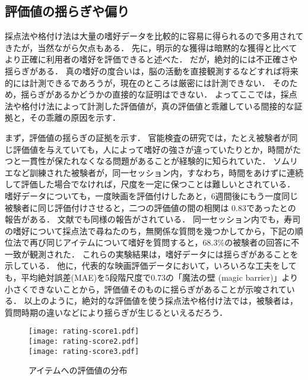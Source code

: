 \subsection{評価値の揺らぎや偏り}

採点法や格付け法は大量の嗜好データを比較的に容易に得られるので多用されてきたが，当然ながら欠点もある．
先に，明示的な獲得は暗黙的な獲得と比べてより正確に利用者の嗜好を評価できると述べた．
だが，絶対的には不正確さや揺らぎがある．
真の嗜好の度合いは，脳の活動を直接観測するなどすれば将来的には計測できるであろうが，現在のところは厳密には計測できない．
そのため，揺らぎがあるかどうかの直接的な証明はできない．
よってここでは，採点法や格付け法によって計測した評価値が，真の評価値と乖離している間接的な証拠と，その乖離の原因を示す．

まず，評価値の揺らぎの証拠を示す．
官能検査の研究では，たとえ被験者が同じ評価値を与えていても，人によって嗜好の強さが違っていたりとか，時間がたつと一貫性が保たれなくなる問題があることが経験的に知られていた\cite{lncs:04:01}．
ソムリエなど訓練された被験者が，同一セッション内，すなわち，時間をあけずに連続して評価した場合でなければ，尺度を一定に保つことは難しいとされている．
嗜好データについても，一度映画を評価付けしたあと，6週間後にもう一度同じ被験者に同じ評価付けさせると，二つの評価値の間の相関は
0.83であったとの報告がある\cite{sigchi:95:01}．
文献\cite{sigchi:03:02}でも同様の報告がされている．
同一セッション内でも，寿司の嗜好について採点法で尋ねたのち，無関係な質問を幾つかしてから，下記の順位法で再び同じアイテムについて嗜好を質問すると，68.3\%の被験者の回答に不一致が観測された\cite{jpublist:043}．
これらの実験結果は，嗜好データには揺らぎがあることを示している．
他に，代表的な映画評価データにおいて，いろいろな工夫をしても，平均絶対誤差(MAE)を5段階尺度で0.73の「魔法の壁 (magic barrier)」より小さくできないことから，評価値そのものに揺らぎがあることが示唆されている\cite{jacm:04:01}．
以上のように，絶対的な評価値を使う採点法や格付け法では，被験者は，質問時期の違いなどにより揺らぎが生じるといえるだろう．

\begin{figure}
\centering
{}%
{\texttt{[image: rating-score1.pdf]}}\\\medskip
{}%
{\texttt{[image: rating-score2.pdf]}}\\\medskip
{}%
{\texttt{[image: rating-score3.pdf]}}
\caption{アイテムへの評価値の分布}
\label{fig:prefdist}
\end{figure}

